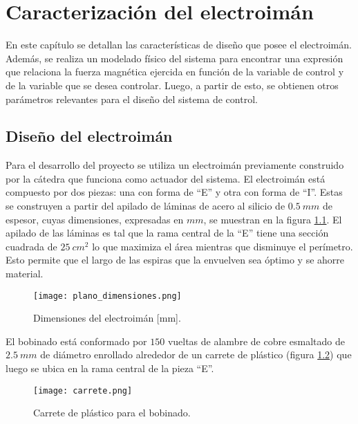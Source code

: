 \chapter{Caracterización del  electroimán}  \label{cap:CaracterizacionElectroiman}

\noindent  En este capítulo se detallan las características de diseño que posee el electroimán. Además, se realiza un modelado físico del sistema para encontrar una expresión que relaciona la fuerza magnética ejercida en función de la variable de control y de la variable que se desea controlar. Luego, a partir de esto, se obtienen otros parámetros relevantes para el diseño del sistema de control.



\section{Diseño del electroimán} \label{section_disenio_electroimán}



\noindent Para el desarrollo del proyecto se utiliza un electroimán previamente construido por la cátedra que funciona como actuador del sistema. El electroimán está compuesto por dos piezas: una con forma de “E” y otra con forma de “I”. Estas se construyen a partir del apilado de láminas de acero al silicio de $0.5\:mm$ de espesor, cuyas dimensiones, expresadas en $mm$, se muestran en la figura \ref{fig:img_plano_dimensiones}. El apilado de las láminas es tal que la rama central de la “E” tiene una sección cuadrada de $25\:cm^{2}$ lo que maximiza el área mientras que disminuye el perímetro. Esto permite que el largo de las espiras que la envuelven sea óptimo y se ahorre material.

\begin{figure}[H]
	\centering
	\texttt{[image: plano\_dimensiones.png]}
	\caption{Dimensiones del electroimán [mm].}
	\label{fig:img_plano_dimensiones}
\end{figure}

\noindent El bobinado está conformado por $150$ vueltas de alambre de cobre esmaltado de $2.5\:mm$ de diámetro enrollado alrededor de un carrete de plástico (figura \ref{fig:img_carrete}) que luego se ubica en la rama central de la pieza ``E''.

\begin{figure}[H]
	\centering
	\texttt{[image: carrete.png]}
	\caption{Carrete de plástico para el bobinado.}
	\label{fig:img_carrete}
\end{figure}


